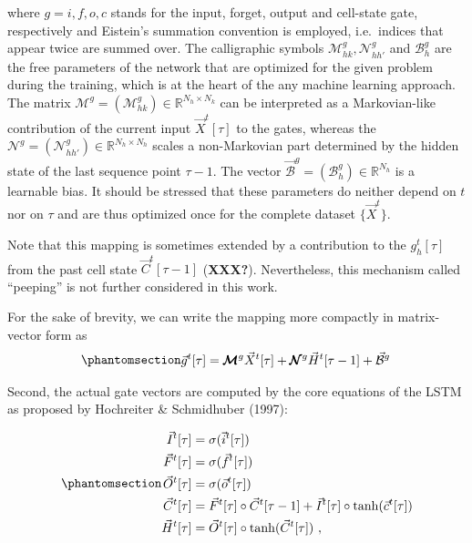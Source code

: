 \documentclass[
]{agujournal2019}
\begin{document}
where \(g=i,f,o,c\) stands for the input, forget, output and cell-state
gate, respectively and Eistein's summation convention is employed,
i.e.~indices that appear twice are summed over. The calligraphic symbols
\(\mathcal{M}^{g}_{hk}, \mathcal{N}^{g}_{hh'}\) and
\(\mathcal{B}^g_{h}\) are the free parameters of the network that are
optimized for the given problem during the training, which is at the
heart of the any machine learning approach. The matrix
\(\pmb{\mathcal{M}}^{g} = (\mathcal{M}^{g}_{hk}) \in \mathbb{R}^{N_h \times N_k}\)
can be interpreted as a Markovian-like contribution of the current input
\(\vec{X}^t[\tau]\) to the gates, whereas the
\(\pmb{\mathcal{N}}^{g} = (\mathcal{N}^{g}_{hh'}) \in \mathbb{R}^{N_h \times N_h}\)
scales a non-Markovian part determined by the hidden state of the last
sequence point \(\tau-1\). The vector
\(\vec{\mathcal{B}}^g = (\mathcal{B}^g_{h}) \in \mathbb{R}^{N_h}\) is a
learnable bias. It should be stressed that these parameters do neither
depend on \(t\) nor on \(\tau\) and are thus optimized once for the
complete dataset \(\{\vec{X}^t\}\).

Note that this mapping is sometimes extended by a contribution to the
\(g_h^t[\tau]\) from the past cell state \(\vec{C}^t[\tau-1]\)
(\textbf{XXX?}). Nevertheless, this mechanism called ``peeping'' is not
further considered in this work.

For the sake of brevity, we can write the mapping more compactly in
matrix-vector form as
\begin{equation}\phantomsection\label{eq-LSTM-gates}{
\begin{aligned}
\vec{g}^t[\tau] = \pmb{\mathcal{M}}^{g}\vec{X}^t[\tau] + \pmb{\mathcal{N}}^{g}  \vec{H}^t[ \tau-1]+ \vec{\mathcal{B}}^g \,
\end{aligned}
}\end{equation}

Second, the actual gate vectors are computed by the core equations of
the LSTM as proposed by Hochreiter \& Schmidhuber (1997):

\begin{equation}\phantomsection\label{eq-LSTM}{
\begin{aligned}
\vec{I}^t[\tau] &= \sigma(\vec{i}^t[\tau]) \\
\vec{F}^t[\tau] &= \sigma(\vec{f}^t[\tau]) \\
\vec{O}^t[\tau] &= \sigma(\vec{o}^t[\tau]) \\
\vec{C}^t[\tau] &= \vec{F}^t[\tau] \circ \vec{C}^t[\tau-1]  + \vec{I}^t[\tau] \circ \tanh(\vec{c}^t[\tau]) \\
\vec{H}^t[\tau]  &= \vec{O}^t[\tau] \circ \tanh(\vec{C}^t[\tau]) \ ,
\end{aligned}
}\end{equation}
\end{document}
